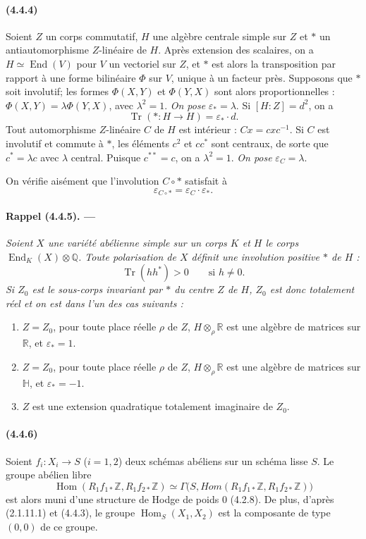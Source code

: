 \documentclass[10pt]{article}
\newcommand{\Q}{\mathbb Q}
\newcommand{\Z}{\mathbb Z}
\newcommand{\Hom}{\operatorname{Hom}}
\newcommand{\R}{\mathbb R}
\providecommand{\End}{\operatorname{End}}
\newcommand{\Tr}{\operatorname{Tr}}
\begin{document}
\paragraph{(4.4.4)} Soient $Z$ un corps commutatif, $H$ une algèbre centrale simple sur $Z$ et $*$ un antiautomorphisme $Z$-linéaire de $H$. Après extension des scalaires, on a $H\simeq\End(V)$ pour $V$ un vectoriel sur $Z$, et $*$ est alors la transposition par rapport à une forme bilinéaire $\Phi$ sur $V$, unique à un facteur près. Supposons que $*$ soit involutif; les formes $\Phi(X,Y)$ et $\Phi(Y,X)$ sont alors proportionnelles : $\Phi(X,Y)=\lambda\Phi(Y,X)$, avec $\lambda^2=1$. \emph{On pose} $\varepsilon_*=\lambda$. Si $[H:Z]=d^2$, on a
\[
\Tr(*:H\to H)=\varepsilon_*\cdot d.
\]
Tout automorphisme $Z$-linéaire $C$ de $H$ est intérieur : $Cx=cxc^{-1}$. Si $C$ est involutif et commute à $*$, les éléments $c^2$ et $cc^*$ sont centraux, de sorte que $c^*=\lambda c$ avec $\lambda$ central. Puisque $c^{**}=c$, on a $\lambda^2=1$. \emph{On pose} $\varepsilon_C=\lambda$.

On vérifie aisément que l'involution $C\circ *$ satisfait à
\[
\varepsilon_{C\circ *}=\varepsilon_C\cdot\varepsilon_*.
\]

\paragraph{Rappel (4.4.5). ---} {\itshape Soient $X$ une variété abélienne simple sur un corps $K$ et $H$ le corps $\End_K(X)\otimes\Q$. Toute polarisation de $X$ définit une involution positive $*$ de $H$ :
\[
\Tr(hh^*)>0\qquad\text{si }h\ne0.
\]
Si $Z_0$ est le sous-corps invariant par $*$ du centre $Z$ de $H$, $Z_0$ est donc totalement réel et on est dans l'un des cas suivants :
\begin{enumerate}[label=\alph*)]
\item $Z=Z_0$, pour toute place réelle $\rho$ de $Z$, $H\otimes_\rho\R$ est une algèbre de matrices sur $\R$, et $\varepsilon_*=1$.
\item $Z=Z_0$, pour toute place réelle $\rho$ de $Z$, $H\otimes_\rho\R$ est une algèbre de matrices sur $\mathbb H$, et $\varepsilon_*= -1$.
\item $Z$ est une extension quadratique totalement imaginaire de $Z_0$.
\end{enumerate}}

\paragraph{(4.4.6)} Soient $f_i:X_i\to S$ ($i=1,2$) deux schémas abéliens sur un schéma lisse $S$. Le groupe abélien libre
\[
\Hom(R_1f_{1*}\Z,R_1f_{2*}\Z)
 \simeq\Gamma\bigl(S,\mathit{Hom}(R_1f_{1*}\Z,R_1f_{2*}\Z)\bigr)
\]
est alors muni d'une structure de Hodge de poids $0$ (4.2.8). De plus, d'après (2.1.11.1) et (4.4.3), le groupe $\Hom_S(X_1,X_2)$ est la composante de type $(0,0)$ de ce groupe.
\end{document}
